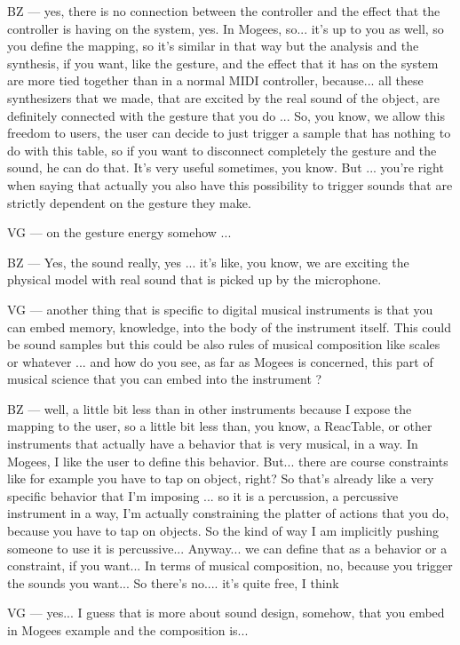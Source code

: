 BZ — yes, there is no connection between the controller and the effect that the controller is having on the system, yes. In Mogees, so... it's up to you as well, so you define the mapping, so it's similar in that way but the analysis and the synthesis, if you want, like the gesture, and the effect that it has on the system are more tied together than in a normal MIDI controller, because... all these synthesizers that we made, that are excited by the real sound of the object, are definitely connected with the gesture that you do ... So, you know, we allow this freedom to users, the user can decide to just trigger a sample that has nothing to do with this table, so if you want to disconnect completely the gesture and the sound, he can do that. It's very useful sometimes, you know. But ... you're right when saying that actually you also have this possibility to trigger sounds that are strictly dependent on the gesture they make. 

VG — on the gesture energy somehow ...

BZ — Yes, the sound really, yes ... it's like, you know, we are exciting the physical model with real sound that is picked up by the microphone. 

VG — another thing that is specific to digital musical instruments is that you can embed memory, knowledge, into the body of the instrument itself. This could be sound samples but this could be also rules of musical composition like scales or whatever ... and how do you see, as far as Mogees is concerned, this part of musical science that you can embed into the instrument ? 

BZ — well, a little bit less than in other instruments because I expose the mapping to the user, so a little bit less than, you know, a ReacTable, or other instruments that actually have a behavior that is very musical, in a way. In Mogees, I like the user to define this behavior. But... there are course constraints like for example you have to tap on object, right? So that's already like a very specific behavior that I'm imposing ... so it is a percussion, a percussive instrument in a way, I'm actually constraining the platter of actions that you do, because you have to tap on objects. So the kind of way I am implicitly pushing someone to use it is percussive... Anyway... we can define that as a behavior or a constraint, if you want... In terms of musical composition, no, because you trigger the sounds you want... So there's no.... it's quite free, I think

VG — yes... I guess that is more about sound design, somehow, that you embed in Mogees example and the composition is...

